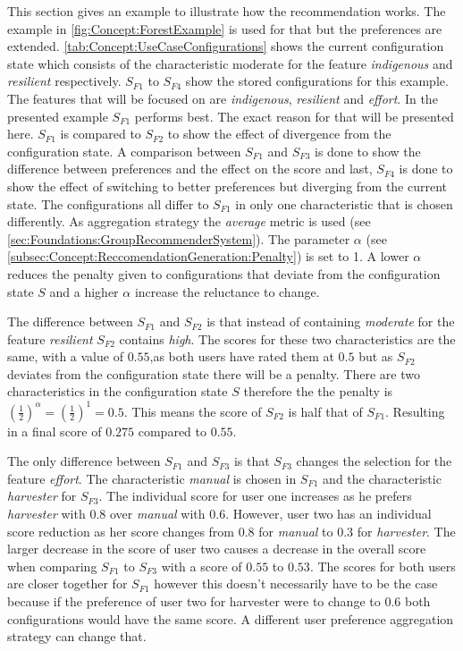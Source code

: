 This section gives an example to illustrate how the recommendation works. The example in \autoref{fig:Concept:ForestExample} is used for that but the preferences are extended. \autoref{tab:Concept:UseCaseConfigurations} shows the current configuration state which consists of the characteristic moderate for the feature \textit{indigenous} and  \textit{resilient} respectively. $S_{F1}$ to $S_{F4}$ show the stored configurations for this example. The features that will be focused on are \textit{indigenous}, \textit{resilient} and \textit{effort}. In the presented example $S_{F1}$ performs best. The exact reason for that will be presented here. $S_{F1}$ is compared to $S_{F2}$ to show the effect of divergence from the configuration state.  A comparison between $S_{F1}$  and $S_{F3}$ is done to show the difference between preferences and the effect on the score and last, $S_{F4}$ is done to show the effect of switching to better preferences but diverging from the current state. The configurations all differ to $S_{F1}$ in only one characteristic that is chosen differently. As aggregation strategy the \emph{average} metric is used (see \autoref{sec:Foundations:GroupRecommenderSystem}). The parameter $\alpha$ (see \autoref{subsec:Concept:ReccomendationGeneration:Penalty}) is set to 1. A lower $\alpha$ reduces the penalty given to configurations that deviate from the configuration state $S$ and a higher $\alpha$ increase the reluctance to change.

The difference between  $S_{F1}$ and  $S_{F2}$ is that instead of containing \emph{moderate} for the feature \emph{resilient} $S_{F2}$ contains \emph{high}. The scores for these two characteristics are the same, with a value of $0.55$,as both users have rated them at $0.5$ but as $S_{F2}$ deviates from the configuration state there will be a penalty. There are two characteristics in the configuration state $S$ therefore the the penalty is $(\frac{1}{2})^\alpha = (\frac{1}{2})^1 = 0.5$. This means the score of $S_{F2}$ is half that of $S_{F1}$. Resulting in a final score of $0.275$ compared to $0.55$.

The only difference between $S_{F1}$ and $S_{F3}$ is that $S_{F3}$ changes the selection for the feature \emph{effort}. The characteristic \emph{manual} is chosen in $S_{F1}$ and the characteristic \emph{harvester} for $S_{F3}$. The individual score for user one increases as he prefers \emph{harvester} with $0.8$ over \emph{manual} with $0.6$. However, user two has an individual score reduction as her score changes from $0.8$ for \emph{manual} to $0.3$ for \emph{harvester}. The larger decrease in the score of user two causes a decrease in the overall score when comparing  $S_{F1}$ to $S_{F3}$ with a score of $0.55$ to $0.53$. The scores for both users are closer together for $S_{F1}$ however this doesn't necessarily have to be the case because if the preference of user two for harvester were to change to $0.6$ both configurations would have the same score. A different user preference aggregation strategy can change that.

